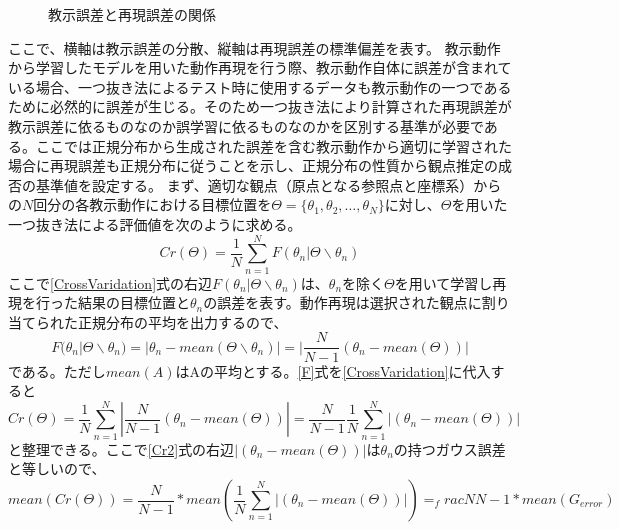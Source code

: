 \begin{figure}
\begin{center}
			\caption{教示誤差と再現誤差の関係}
			\label{figure:errors}
		\end{center}
	\end{figure}
ここで、横軸は教示誤差の分散、縦軸は再現誤差の標準偏差を表す。
教示動作から学習したモデルを用いた動作再現を行う際、教示動作自体に誤差が含まれている場合、一つ抜き法によるテスト時に使用するデータも教示動作の一つであるために必然的に誤差が生じる。そのため一つ抜き法により計算された再現誤差が教示誤差に依るものなのか誤学習に依るものなのかを区別する基準が必要である。ここでは正規分布から生成された誤差を含む教示動作から適切に学習された場合に再現誤差も正規分布に従うことを示し、正規分布の性質から観点推定の成否の基準値を設定する。
まず、適切な観点（原点となる参照点と座標系）からの$N$回分の各教示動作における目標位置を$Θ=\{θ_{1} , θ_{2} , \ldots , θ_{N}\}$に対し、$Θ$を用いた一つ抜き法による評価値を次のように求める。
	\begin{equation}
	\label{CrossVaridation}
Cr(Θ) = \frac{1}{N} \sum_{n=1}^{N} F(θ_{n} | Θ \backslash θ_{n})
\end{equation}
ここで\ref{CrossVaridation}式の右辺$F(θ_{n} | Θ \backslash θ_{n})$は、$θ_{n}$を除く$Θ$を用いて学習し再現を行った結果の目標位置と$θ_{n}$の誤差を表す。動作再現は選択された観点に割り当てられた正規分布の平均を出力するので、
\begin{equation}
\label{F}
F(θ_{n} | Θ \backslash θ_{n}) = |θ_{n} - mean(Θ \backslash θ_{n})| = |\frac{N}{N-1}(θ_{n} - mean(Θ))|
\end{equation}
である。ただし$mean(A)$はAの平均とする。\ref{F}式を\ref{CrossVaridation}に代入すると
\begin{equation}
\label{Cr2}
Cr(Θ) = \frac{1}{N} \sum_{n=1}^{N}  |\frac{N}{N-1}(θ_{n} - mean(Θ))|
 = \frac{N}{N-1}\frac{1}{N}  \sum_{n=1}^{N}  |(θ_{n} - mean(Θ))| 
\end{equation}
と整理できる。ここで\ref{Cr2}式の右辺$|(θ_{n} - mean(Θ))|$は$θ_{n}$の持つガウス誤差と等しいので、
\begin{equation}
\label{Cr3}
mean(Cr(Θ)) = \frac{N}{N-1} * mean(\frac{1}{N}  \sum_{n=1}^{N}  |(θ_{n} - mean(Θ))| )
 = _frac{N}{N-1} * mean(G_{error})
\end{equation}




